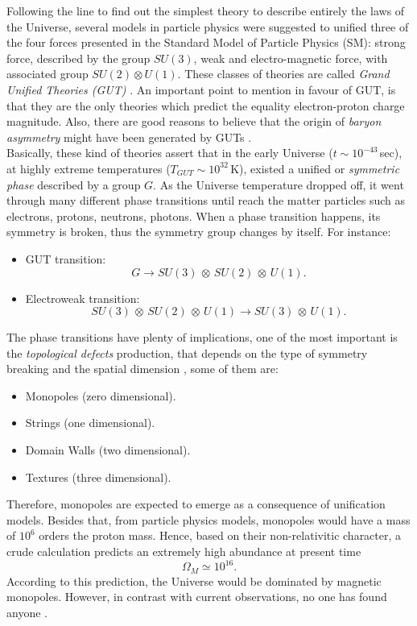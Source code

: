 \documentclass{rmaa}
\begin{document}
Following the line to find out the simplest theory to describe entirely the laws of the Universe,
several models in particle physics were suggested to unified three of the 
four forces presented in the Standard Model of Particle Physics (SM): strong force, described
by the group $SU(3)$, weak and electro-magnetic force, with associated group $SU(2)\otimes U(1)$. 
These classes of theories are called \textit{Grand Unified Theories (GUT)} \citep{Georgi}.
 An important point to mention in favour of GUT,  is that they are the only theories which 
 predict the equality electron-proton charge magnitude. Also, there are good reasons to 
 believe that the origin of \textit{baryon asymmetry} might have been generated by GUTs \citep{Kolb83}.
\\

Basically, these kind of theories assert that in the early Universe ($t \sim 10^{-43}\, $sec), 
at highly extreme temperatures ($T_{GUT}\sim 10^{32} \, $K), existed a unified or 
\textit{symmetric phase} described by a group $G$. As the Universe
temperature dropped off, it went through many different phase transitions until reach 
the matter particles such as electrons, protons, neutrons, photons.
%
When a phase transition happens, its symmetry is broken, thus the symmetry group changes by itself.
For instance: 
 \begin{itemize}
 \item GUT transition: $$G \to SU(3)\,\otimes\, SU(2)\, \otimes \, U(1).$$
 \item Electroweak transition: $$SU(3)\,\otimes\, SU(2)\, \otimes \, U(1) \to SU(3)\, \otimes \, U(1).$$ 
\end{itemize}

\noindent
The phase transitions have plenty of implications, one of the most important is the
\textit{topological defects} production, that depends on the type of symmetry breaking 
and the spatial dimension \citep{Vilenkin}, some of them are:   

\begin{itemize}
\item Monopoles (zero dimensional).
\item Strings (one dimensional).
\item Domain Walls (two dimensional).
\item Textures (three dimensional).
\end{itemize}

\noindent
Therefore, monopoles are expected to emerge as a consequence of unification models. 
Besides that, from particle physics models, monopoles would have a mass of $10^6$ orders the proton 
mass. Hence, based on their non-relativitic character, 
a crude calculation predicts an extremely high abundance at present time \citep{Coles}
$$
\Omega_M \simeq 10^{16}.
$$
%
According to this prediction, the Universe would be dominated by magnetic monopoles.
However, in contrast with current observations, no one
has found anyone \citep{Ambrosio02}. 
\\
\end{document}

